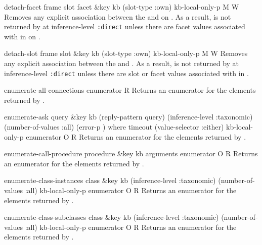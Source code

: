\begin{okbcop}{detach-facet}{ frame slot facet \&key kb (slot-type :own) kb-local-only-p} { \void } { M } { W } {  }
Removes any explicit association between the  and
    on .  As a result,  is not returned
   by  at inference-level {\tt :direct} unless there are
   facet values associated with  in  on
   .
\end{okbcop}

\begin{okbcop}{detach-slot}{ frame slot \&key kb (slot-type :own) kb-local-only-p} { \void } { M } { W } {  }
Removes any explicit association between the  and
   .  As a result,  is not returned by
    at inference-level {\tt :direct} unless there are
   slot or facet values associated with  in .
\end{okbcop}

\begin{okbcop}{enumerate-all-connections}{ } { enumerator } {   } { R } {  }
Returns an enumerator for the elements returned by 
.
\end{okbcop}

\begin{okbcop}{enumerate-ask}{ query \&key kb (reply-pattern query) (inference-level :taxonomic) (number-of-values :all) (error-p \true) where timeout (value-selector :either) kb-local-only-p} { enumerator } { O } { R } {  }
Returns an enumerator for the elements returned by 
.
\end{okbcop}

\begin{okbcop}{enumerate-call-procedure}{ procedure \&key kb arguments} { enumerator } { O } { R } {  }
Returns an enumerator for the elements returned by 
.
\end{okbcop}

\begin{okbcop}{enumerate-class-instances}{ class \&key kb (inference-level :taxonomic) (number-of-values :all) kb-local-only-p} { enumerator } { O } { R } {  }
Returns an enumerator for the elements returned by 
.
\end{okbcop}

\begin{okbcop}{enumerate-class-subclasses}{ class \&key kb (inference-level :taxonomic) (number-of-values :all) kb-local-only-p} { enumerator } { O } { R } {  }
Returns an enumerator for the elements returned by 
.
\end{okbcop}

